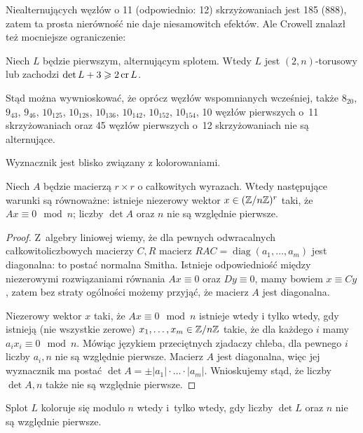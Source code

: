 Niealternujących węzłów o 11 (odpowiednio: 12) skrzyżowaniach jest 185 (888), zatem ta prosta nierówność nie daje niesamowitch efektów.
Ale Crowell znalazł też mocniejsze ograniczenie:

\begin{proposition}
    Niech $L$ będzie pierwszym, alternującym splotem.
    Wtedy $L$ jest $(2, n)$-torusowy lub zachodzi $\det L + 3 \geqslant 2 \operatorname{cr} L$.
\end{proposition}

Stąd można wywnioskować, że oprócz węzłów wspomnianych wcześniej, także $8_{20}$, 
$9_{43}$, $9_{46}$, $10_{125}$, $10_{128}$, $10_{136}$, $10_{142}$, $10_{152}$, $10_{154}$, 10 węzłów pierwszych o~11 skrzyżowaniach oraz 45 węzłów pierwszych o~12 skrzyżowaniach nie są alternujące.

Wyznacznik jest blisko związany z kolorowaniami.

\begin{lemma}
    Niech $A$ będzie macierzą $r \times r$ o całkowitych wyrazach.
    Wtedy następujące warunki są równoważne: istnieje niezerowy wektor $x \in (\mathbb Z/n\mathbb Z)^r$ taki, że $Ax \equiv 0 \mod n$; liczby $\det A$ oraz $n$ nie są względnie pierwsze.
\end{lemma}

\begin{proof}
    Z~algebry liniowej wiemy, że dla pewnych odwracalnych całkowitoliczbowych macierzy $C, R$ macierz $RAC = \operatorname{diag}(a_1, \ldots, a_m)$ jest diagonalna: to postać normalna Smitha.
    Istnieje odpowiedniość między niezerowymi rozwiązaniami równania $Ax \equiv 0$ oraz $Dy \equiv 0$, mamy bowiem $x \equiv Cy$, zatem bez straty ogólności możemy przyjąć, że macierz $A$ jest diagonalna.

    Niezerowy wektor $x$ taki, że $Ax \equiv 0 \mod n$ istnieje wtedy i tylko wtedy, gdy istnieją (nie wszystkie zerowe) $x_1, \ldots, x_m \in \mathbb Z/n\mathbb Z$ takie, że dla każdego $i$ mamy $a_ix_i \equiv 0 \mod n$.
    Mówiąc językiem przeciętnych zjadaczy chleba, dla pewnego $i$ liczby $a_i, n$ nie są względnie pierwsze.
    Macierz $A$ jest diagonalna, więc jej wyznacznik ma postać $\det A = \pm |a_1| \cdot \ldots \cdot |a_m|$.
    Wnioskujemy stąd, że liczby $\det A, n$ także nie są względnie pierwsze.
\end{proof}

\begin{proposition}
\label{prp:colour_determinant}%
    Splot $L$ koloruje się modulo $n$ wtedy i~tylko wtedy, gdy liczby $\det L$ oraz $n$ nie są względnie pierwsze.
\end{proposition}

